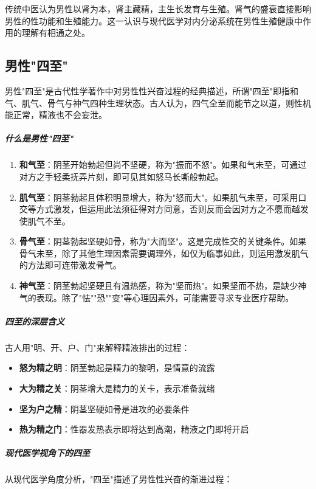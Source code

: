 \begin{enumerate}
传统中医认为男性以肾为本，肾主藏精，主生长发育与生殖。肾气的盛衰直接影响男性的性功能和生殖能力。这一认识与现代医学对内分泌系统在男性生殖健康中作用的理解有相通之处。

\subsection{男性"四至"}

男性"四至"是古代性学著作中对男性性兴奋过程的经典描述，所谓"四至"即指和气、肌气、骨气与神气四种生理状态。古人认为，四气全至而能节之以道，则性机能正常，精液也不会妄泄。

\subparagraph{什么是男性"四至"}

\begin{enumerate}
    \item \textbf{和气至}：阴茎开始勃起但尚不坚硬，称为"振而不怒"。如果和气未至，可通过对方之手轻柔抚弄片刻，即可见其如怒马长嘶般勃起。
    
    \item \textbf{肌气至}：阴茎勃起且体积明显增大，称为"怒而大"。如果肌气未至，可采用口交等方式激发，但运用此法须征得对方同意，否则反而会因对方之不愿而越发使肌气不至。
    
    \item \textbf{骨气至}：阴茎勃起坚硬如骨，称为"大而坚"。这是完成性交的关键条件。如果骨气未至，除了其他生理因素需要调理外，如仅为临事如此，则运用激发肌气的方法即可连带激发骨气。
    
    \item \textbf{神气至}：阴茎勃起坚硬且有温热感，称为"坚而热"。如果坚而不热，是缺少神气的表现。除了"怯""恐""变"等心理因素外，可能需要寻求专业医疗帮助。
\end{enumerate}

\subparagraph{四至的深层含义}

古人用"明、开、户、门"来解释精液排出的过程：
\begin{itemize}
    \item \textbf{怒为精之明}：阴茎勃起是精力的黎明，是情意的流露
    \item \textbf{大为精之关}：阴茎增大是精力的关卡，表示准备就绪
    \item \textbf{坚为户之精}：阴茎坚硬如骨是进攻的必要条件
    \item \textbf{热为精之门}：性器发热表示即将达到高潮，精液之门即将开启
\end{itemize}

\subparagraph{现代医学视角下的四至}

从现代医学角度分析，"四至"描述了男性性兴奋的渐进过程：


\end{enumerate}
